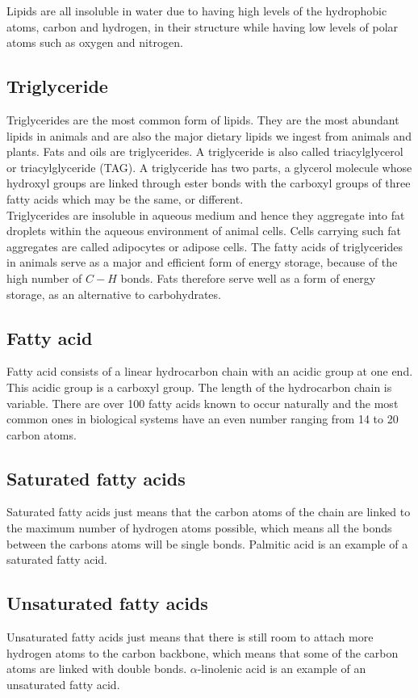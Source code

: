\documentclass[11pt]{article}
\begin{document}
Lipids are all insoluble in water due to having high levels of the hydrophobic atoms, carbon and hydrogen, in their structure while having low levels of polar atoms such as oxygen and nitrogen.

\subsection{Triglyceride}
\label{sec:org420b718}
Triglycerides are the most common form of lipids. They are the most abundant lipids in animals and are also the major dietary lipids we ingest from animals and plants. Fats and oils are triglycerides. A triglyceride is also called triacylglycerol or triacylglyceride (TAG). A triglyceride has two parts, a glycerol molecule whose hydroxyl groups are linked through ester bonds with the carboxyl groups of three fatty acids which may be the same, or different.
\\[0pt]

Triglycerides are insoluble in aqueous medium and hence they aggregate into fat droplets within the aqueous environment of animal cells. Cells carrying such fat aggregates are called adipocytes or adipose cells. The fatty acids of triglycerides in animals serve as a major and efficient form of energy storage, because of the high number of \(C - H\) bonds. Fats therefore serve well as a form of energy storage, as an alternative to carbohydrates.

\subsection{Fatty acid}
\label{sec:org0072788}
Fatty acid consists of a linear hydrocarbon chain with an acidic group at one end. This acidic group is a carboxyl group. The length of the hydrocarbon chain is variable. There are over 100 fatty acids known to occur naturally and the most common ones in biological systems have an even number ranging from 14 to 20 carbon atoms.

\subsection{Saturated fatty acids}
\label{sec:org7889090}
Saturated fatty acids just means that the carbon atoms of the chain are linked to the maximum number of hydrogen atoms possible, which means all the bonds between the carbons atoms will be single bonds. Palmitic acid is an example of a saturated fatty acid.

\subsection{Unsaturated fatty acids}
\label{sec:orga3ff1b7}
Unsaturated fatty acids just means that there is still room to attach more hydrogen atoms to the carbon backbone, which means that some of the carbon atoms are linked with double bonds. \(\alpha\)-linolenic acid is an example of an unsaturated fatty acid.
\end{document}
